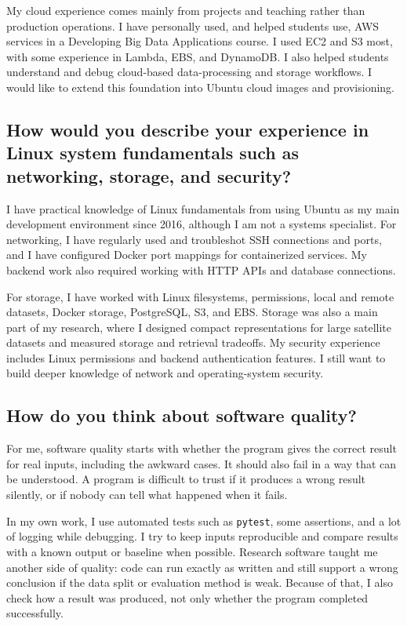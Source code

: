 \documentclass[11pt]{article}
\begin{document}
My cloud experience comes mainly from projects and teaching rather than production operations. I have personally used, and helped students use, AWS services in a Developing Big Data Applications course. I used EC2 and S3 most, with some experience in Lambda, EBS, and DynamoDB. I also helped students understand and debug cloud-based data-processing and storage workflows. I would like to extend this foundation into Ubuntu cloud images and provisioning.

\subsection*{How would you describe your experience in Linux system fundamentals such as networking, storage, and security?}

I have practical knowledge of Linux fundamentals from using Ubuntu as my main development environment since 2016, although I am not a systems specialist. For networking, I have regularly used and troubleshot SSH connections and ports, and I have configured Docker port mappings for containerized services. My backend work also required working with HTTP APIs and database connections.

For storage, I have worked with Linux filesystems, permissions, local and remote datasets, Docker storage, PostgreSQL, S3, and EBS. Storage was also a main part of my research, where I designed compact representations for large satellite datasets and measured storage and retrieval tradeoffs. My security experience includes Linux permissions and backend authentication features. I still want to build deeper knowledge of network and operating-system security.

\subsection*{How do you think about software quality?}

For me, software quality starts with whether the program gives the correct result for real inputs, including the awkward cases. It should also fail in a way that can be understood. A program is difficult to trust if it produces a wrong result silently, or if nobody can tell what happened when it fails.

In my own work, I use automated tests such as \texttt{pytest}, some assertions, and a lot of logging while debugging. I try to keep inputs reproducible and compare results with a known output or baseline when possible. Research software taught me another side of quality: code can run exactly as written and still support a wrong conclusion if the data split or evaluation method is weak. Because of that, I also check how a result was produced, not only whether the program completed successfully.
\end{document}
